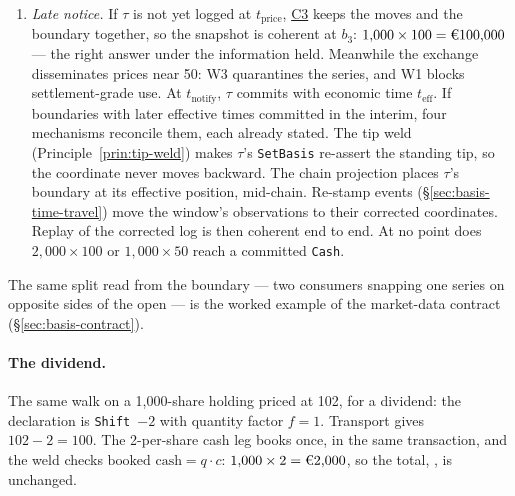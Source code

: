 \begin{enumerate}[nosep]
$\mathrm{PnL}_{\text{flow}}=(2{,}000-2{,}000)\times55=0$. A naive decomposition that
compares the  close against the un-transported  open instead splits
the  into $1{,}000\times(55-100)=-45{,}000$ of ``price'' and
$(2{,}000-1{,}000)\times55=+55{,}000$ of ``flow'' --- two large terms that are artefacts
of mixing the pre- and post-split frames. Transporting the opening pair across the split
removes them: the decomposition, not only its sum, is basis-invariant, and it can be
written only through the one declared door.
\item \emph{Late notice.} If $\tau$ is not yet logged at $t_{\mathrm{price}}$,
\hyperref[cond:C3]{C3} keeps the moves and the boundary together, so the snapshot is
coherent at $b_3$: $1{,}000\times100=\EUR{100{,}000}$ --- the right answer under the
information held. Meanwhile the exchange disseminates prices near 50: W3 quarantines
the series, and W1 blocks settlement-grade use. At $t_{\mathrm{notify}}$, $\tau$
commits with economic time $t_{\mathrm{eff}}$. If boundaries with later
effective times committed in the interim, four mechanisms reconcile them, each
already stated. The tip weld (Principle~\ref{prin:tip-weld}) makes $\tau$'s
\texttt{SetBasis} re-assert the standing tip, so the coordinate never moves
backward. The chain projection places $\tau$'s boundary at its effective
position, mid-chain. Re-stamp events (\S\ref{sec:basis-time-travel}) move the
window's observations to their corrected coordinates. Replay of the corrected
log is then coherent end to end. At no point does $2{,}000\times100$ or
$1{,}000\times50$ reach a committed \texttt{Cash}.
\end{enumerate}

\noindent The same split read from the boundary --- two consumers snapping one series
on opposite sides of the open --- is the worked example of the market-data contract
(\S\ref{sec:basis-contract}).

\paragraph{The dividend.} The same walk on a 1{,}000-share holding priced at 102, for
a  dividend: the declaration is \texttt{Shift}~$-2$ with quantity factor $f=1$.
Transport gives $102-2=100$. The 2-per-share cash leg books once, in the same
transaction, and the weld checks $\text{booked cash}=q\cdot c$:
$1{,}000\times2=\EUR{2{,}000}$, so the total, , is unchanged.

